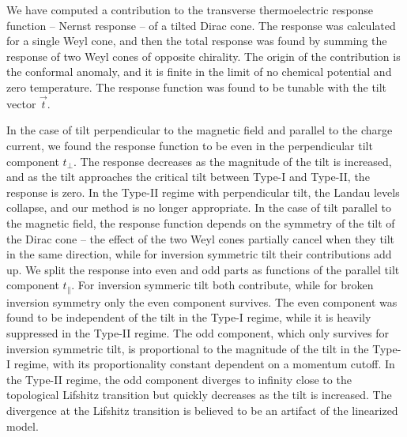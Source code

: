 We have computed a contribution to the transverse thermoelectric response function -- Nernst response -- of a tilted Dirac cone.
The response was calculated for a single Weyl cone, and then the total response was found by summing the response of two Weyl cones of opposite chirality.
The origin of the contribution is the conformal anomaly, and it is finite in the limit of no chemical potential and zero temperature.
The response function was found to be tunable with the tilt vector \( \vec{t} \).

In the case of tilt perpendicular to the magnetic field and parallel to the charge current, we found the response function to be even in the perpendicular tilt component \( t_{\perp} \).
The response decreases as the magnitude of the tilt is increased, and as the tilt approaches the critical tilt between Type-I and Type-II, the response is zero.
In the Type-II regime with perpendicular tilt, the Landau levels collapse, and our method is no longer appropriate.
In the case of tilt parallel to the magnetic field, the response function depends on the symmetry of the tilt of the Dirac cone -- the effect of the two Weyl cones partially cancel when they tilt in the same direction, while for inversion symmetric tilt their contributions add up.
We split the response into even and odd parts as functions of the parallel tilt component \( t_{\parallel} \).
For inversion symmeric tilt both contribute, while for broken inversion symmetry only the even component survives.
The even component was found to be independent of the tilt in the Type-I regime, while it is heavily suppressed in the Type-II regime.
The odd component, which only survives for inversion symmetric tilt, is proportional to the magnitude of the tilt in the Type-I regime, with its proportionality constant dependent on a momentum cutoff.
In the Type-II regime, the odd component diverges to infinity close to the topological Lifshitz transition but quickly decreases as the tilt is increased.
The divergence at the Lifshitz transition is believed to be an artifact of the linearized model.

